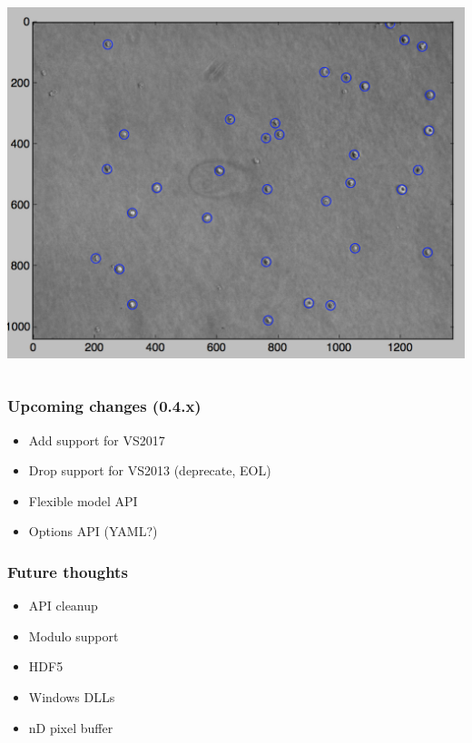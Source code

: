 \documentclass{beamer}
\begin{document}
\begin{frame}[fragile]
\begin{columns}
\begin{column}{0.4\textwidth}
      \includegraphics[width=\textwidth]{cpp-dundee-2017-figures/overlay.png}
    \end{column}
  \end{columns}
\end{frame}

\begin{frame}[fragile]
  \frametitle{Upcoming changes (0.4.x)}

  \begin{itemize}
  \item Add support for VS2017
  \item Drop support for VS2013 (deprecate, EOL)
  \item Flexible model API
  \item Options API (YAML?)
  \end{itemize}
\end{frame}

\begin{frame}[fragile]
  \frametitle{Future thoughts}

  \begin{itemize}
  \item API cleanup
  \item Modulo support
  \item HDF5
  \item Windows DLLs
  \item nD pixel buffer
  \end{itemize}
\end{frame}
\end{document}
